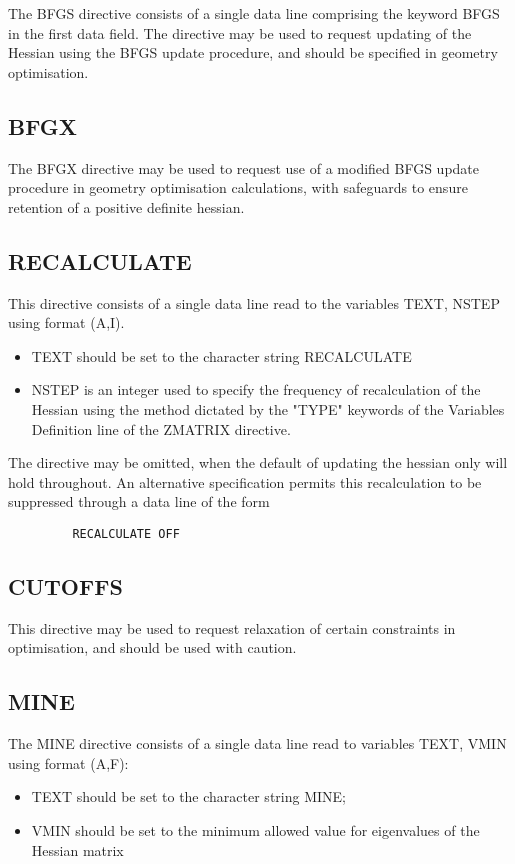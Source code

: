 \documentclass[11pt,fleqn]{article}
\begin{document}
The BFGS directive consists of a single data line comprising
the keyword BFGS in the first data field. 
The directive may be used to request
updating of the  Hessian using the BFGS update procedure,
and should be specified in geometry optimisation.

\subsection{BFGX}

The BFGX directive may be used to request use of a modified
BFGS update procedure in geometry optimisation 
calculations, with safeguards to ensure retention of a 
positive definite hessian.

\subsection{RECALCULATE} 

This directive consists of a single data line
read to the variables TEXT, NSTEP using format (A,I).
\begin{itemize}
\item TEXT should be set to the character string RECALCULATE
\item NSTEP is an integer used to specify
the frequency of recalculation of the Hessian
using the method dictated by the "TYPE" keywords
of the Variables Definition line of the ZMATRIX directive.
\end{itemize}
The directive may be omitted, when the default of updating the
hessian only will hold throughout. An alternative specification
permits this recalculation to be suppressed through a data line
of the form

{
\footnotesize
\begin{verbatim}
         RECALCULATE OFF
\end{verbatim}
}

\subsection{CUTOFFS}

This directive may be used to request
relaxation of  certain constraints in optimisation, and should be
used with caution.

\subsection{MINE}

The MINE directive consists of a single data line
read to variables TEXT, VMIN using format (A,F):
\begin{itemize}
\item TEXT should be set to the character string MINE;
\item VMIN should be set to the
minimum allowed value for eigenvalues of the Hessian matrix
\end{itemize}
\end{document}
